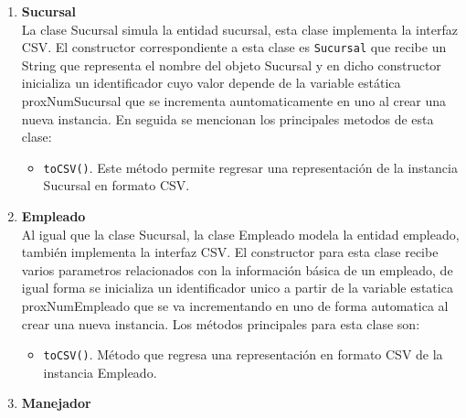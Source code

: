 \documentclass[10pt]{article}
\begin{document}
    \begin{enumerate}
    	\item {\bf{Sucursal}} \\
    	
    	La clase Sucursal simula la entidad sucursal, esta clase implementa la interfaz CSV. El constructor correspondiente a esta clase es  {\texttt{Sucursal}} que recibe un String que representa el nombre del objeto Sucursal y en dicho constructor inicializa un identificador cuyo valor depende de la variable estática proxNumSucursal que se incrementa auntomaticamente en uno al crear una nueva instancia. En seguida se mencionan los principales metodos de esta clase:
    	
    	\begin{itemize}
    		
    		\item {\texttt{toCSV()}}. Este método permite regresar una representación de la instancia Sucursal en formato CSV.
    	\end{itemize} 
    	
    	
    	
    	\item {\bf{Empleado}}\\
    	
    	Al igual que la clase Sucursal, la clase Empleado modela la entidad empleado, también implementa la interfaz CSV. El constructor para esta clase recibe varios parametros relacionados con la información básica de un empleado, de igual forma se inicializa un identificador unico a partir de la variable estatica proxNumEmpleado que se va incrementando en uno de forma automatica al crear una nueva instancia.
    	Los métodos principales para esta clase son:\\
    	
    	\begin{itemize}
    		\item {\texttt{toCSV()}}. Método que regresa una representación en formato CSV de la instancia Empleado.
    	\end{itemize}
    	
    	\item {\bf{Manejador}}\\
    	

\end{enumerate}
\end{document}
